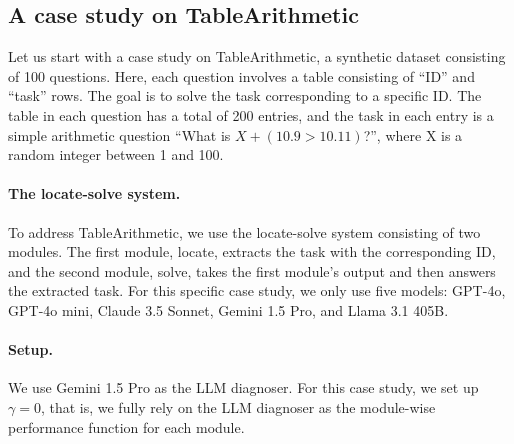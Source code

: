 \subsection{A case study on TableArithmetic}

Let us start with a case study on TableArithmetic, a synthetic dataset consisting of 100 questions. Here, each question involves a table consisting of ``ID'' and ``task'' rows. The goal is to solve the task corresponding to a specific ID. The table in each question has a total of 200 entries, and
 the task in each entry is a simple arithmetic question ``What is $X+(10.9>10.11)$?'', where X is a random integer between 1 and 100. 

\paragraph{The locate-solve system.} To address TableArithmetic, we use the locate-solve system consisting of two modules. The first module, locate, extracts the task with the corresponding ID, and the second module, solve, takes the first module's output and then answers the extracted task. For this specific case study, we only use five models: GPT-4o, GPT-4o mini, Claude 3.5 Sonnet, Gemini 1.5 Pro, and Llama 3.1 405B.   

\paragraph{\deluxesystem{} Setup.} We use Gemini 1.5 Pro as the LLM diagnoser. For this case study, we set up $\gamma=0$, that is, we fully rely on the LLM diagnoser as the module-wise performance function for each module.  


 
